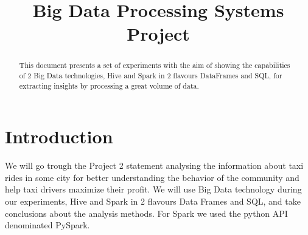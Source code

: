 \documentclass[conference,compsoc]{IEEEtran}
\begin{document}
%
\title{Big Data Processing Systems\\ Project}


\author{

}




\maketitle

\begin{abstract}
This document presents a set of experiments with the aim of showing the capabilities of 2 Big Data technologies, Hive and Spark in 2 flavours DataFrames and SQL, for extracting insights by processing a great volume of data.
\end{abstract}





%
\IEEEpeerreviewmaketitle




\section{Introduction}
We will go trough the Project 2 statement\cite{IEEEhowto:bdpsp1} analysing the  information about taxi rides in some city for better understanding the behavior of the community and help taxi drivers maximize their profit. We will use Big Data technology during our experiments, Hive and Spark in 2 flavours Data Frames and SQL, and take conclusions about the analysis methods. For Spark we used the python API denominated PySpark.
\end{document}
